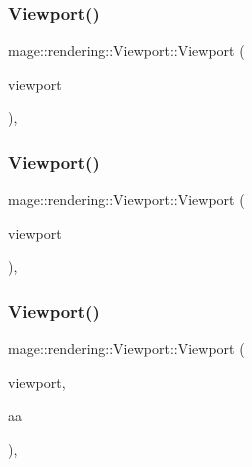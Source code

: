 \subsubsection{\texorpdfstring{Viewport()}{Viewport()}\hspace{0.1cm}{\footnotesize\ttfamily [5/7]}}
{\footnotesize\ttfamily mage\+::rendering\+::\+Viewport\+::\+Viewport (\begin{DoxyParamCaption}\item[{const \mbox{\hyperlink{classmage_1_1rendering_1_1_viewport}{Viewport}} \&}]{viewport }\end{DoxyParamCaption})\hspace{0.3cm}{\ttfamily [default]}, {\ttfamily [noexcept]}}

\mbox{\label{classmage_1_1rendering_1_1_viewport_a33d8073522c9ac9044da148b44023b2b}} 
\subsubsection{\texorpdfstring{Viewport()}{Viewport()}\hspace{0.1cm}{\footnotesize\ttfamily [6/7]}}
{\footnotesize\ttfamily mage\+::rendering\+::\+Viewport\+::\+Viewport (\begin{DoxyParamCaption}\item[{\mbox{\hyperlink{classmage_1_1rendering_1_1_viewport}{Viewport}} \&\&}]{viewport }\end{DoxyParamCaption})\hspace{0.3cm}{\ttfamily [default]}, {\ttfamily [noexcept]}}

\mbox{\label{classmage_1_1rendering_1_1_viewport_acf0de68217027c47ac4fe36b58da7213}} 
\subsubsection{\texorpdfstring{Viewport()}{Viewport()}\hspace{0.1cm}{\footnotesize\ttfamily [7/7]}}
{\footnotesize\ttfamily mage\+::rendering\+::\+Viewport\+::\+Viewport (\begin{DoxyParamCaption}\item[{\mbox{\hyperlink{classmage_1_1rendering_1_1_viewport}{Viewport}}}]{viewport,  }\item[{\mbox{\hyperlink{namespacemage_1_1rendering_ac3f75e49e92b42f2f5fb55c450d8899c}{Anti\+Aliasing}}}]{aa }\end{DoxyParamCaption})\hspace{0.3cm}{\ttfamily [explicit]}, {\ttfamily [noexcept]}}

